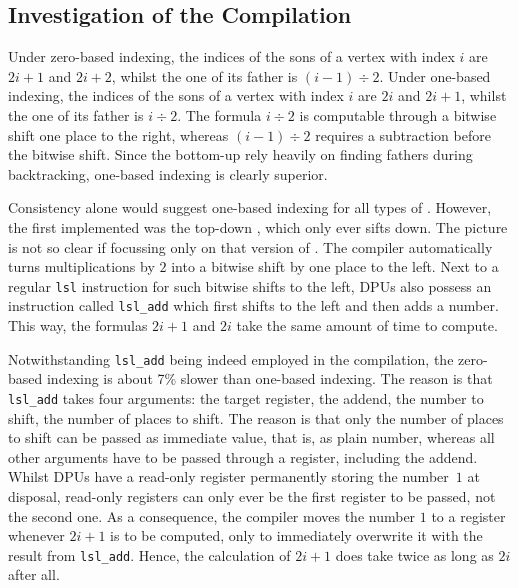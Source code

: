\subsection*{Investigation of the Compilation}
\label{sec:tasklet:heap:compilation}

Under zero-based indexing, the indices of the sons of a vertex with index \(i\) are \(2 i + 1\) and \(2 i + 2\), whilst the one of its father is \((i - 1) \div 2\).
Under one-based indexing, the indices of the sons of a vertex with index \(i\) are \(2 i\) and \(2 i + 1\), whilst the one of its father is \(i \div 2\).
The formula \(i \div 2\) is computable through a bitwise shift one place to the right, whereas \((i - 1) \div 2\) requires a subtraction before the bitwise shift.
Since the bottom-up \HS*{} rely heavily on finding fathers during backtracking, one-based indexing is clearly superior.

Consistency alone would suggest one-based indexing for all types of \HS{}.
However, the first \HS{} implemented was the top-down \HS{}, which only ever sifts down.
The picture is not so clear if focussing only on that version of \HS{}.
The compiler automatically turns multiplications by \(2\) into a bitwise shift by one place to the left.
Next to a regular \lstinline|lsl| instruction for such bitwise shifts to the left, DPUs also possess an instruction called \lstinline|lsl_add| which first shifts to the left and then adds a number.
This way, the formulas \(2i + 1\) and \(2i\) take the same amount of time to compute.

Notwithstanding \lstinline|lsl_add| being indeed employed in the compilation, the zero-based indexing is about 7\% slower than one-based indexing.
The reason is that \lstinline|lsl_add| takes four arguments:
the target register, the addend, the number to shift, the number of places to shift.
The reason is that only the number of places to shift can be passed as immediate value, that is, as plain number, whereas all other arguments have to be passed through a register, including the addend.
Whilst DPUs have a read-only register permanently storing the number~\(1\) at disposal, read-only registers can only ever be the first register to be passed, not the second one.
As a consequence, the compiler moves the number \(1\) to a register whenever \(2i + 1\) is to be computed, only to immediately overwrite it with the result from \lstinline|lsl_add|.
Hence, the calculation of \(2i + 1\) does take twice as long as \(2 i\) after all.

